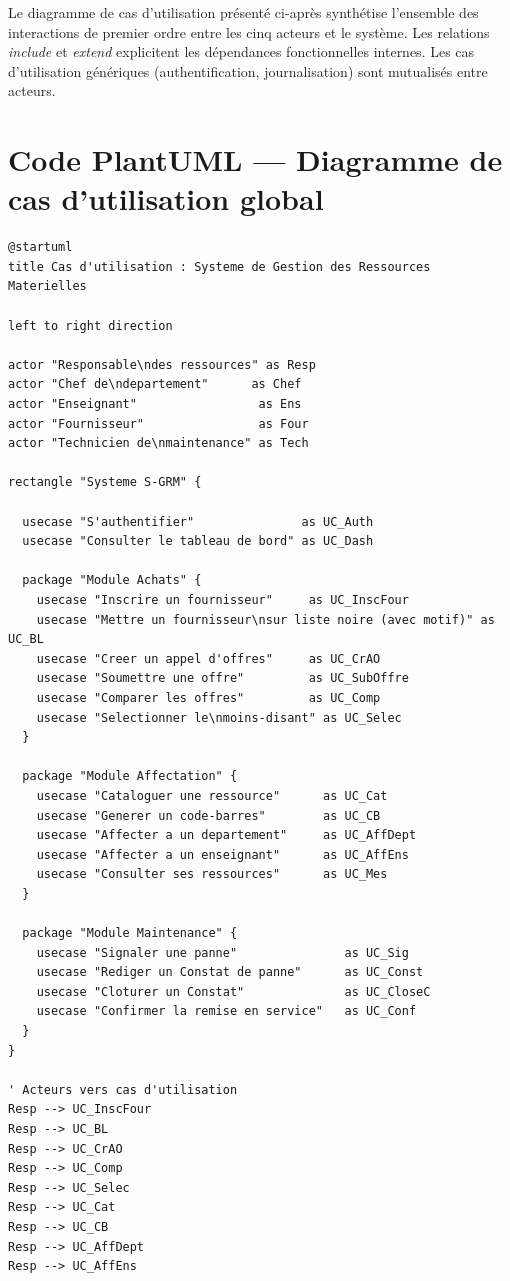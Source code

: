 \documentclass[a4paper,11pt,openany]{report}
\begin{document}
Le diagramme de cas d'utilisation présenté ci-après synthétise
l'ensemble des interactions de premier ordre entre les cinq
acteurs et le système. Les relations \emph{include} et
\emph{extend} explicitent les dépendances fonctionnelles
internes. Les cas d'utilisation génériques (authentification,
journalisation) sont mutualisés entre acteurs.

\section{Code PlantUML --- Diagramme de cas d'utilisation global}

\begin{lstlisting}[caption={Diagramme UML --- Cas d'utilisation global},
                   label={lst:umlUseCase}]
@startuml
title Cas d'utilisation : Systeme de Gestion des Ressources Materielles

left to right direction

actor "Responsable\ndes ressources" as Resp
actor "Chef de\ndepartement"      as Chef
actor "Enseignant"                 as Ens
actor "Fournisseur"                as Four
actor "Technicien de\nmaintenance" as Tech

rectangle "Systeme S-GRM" {

  usecase "S'authentifier"               as UC_Auth
  usecase "Consulter le tableau de bord" as UC_Dash

  package "Module Achats" {
    usecase "Inscrire un fournisseur"     as UC_InscFour
    usecase "Mettre un fournisseur\nsur liste noire (avec motif)" as UC_BL
    usecase "Creer un appel d'offres"     as UC_CrAO
    usecase "Soumettre une offre"         as UC_SubOffre
    usecase "Comparer les offres"         as UC_Comp
    usecase "Selectionner le\nmoins-disant" as UC_Selec
  }

  package "Module Affectation" {
    usecase "Cataloguer une ressource"      as UC_Cat
    usecase "Generer un code-barres"        as UC_CB
    usecase "Affecter a un departement"     as UC_AffDept
    usecase "Affecter a un enseignant"      as UC_AffEns
    usecase "Consulter ses ressources"      as UC_Mes
  }

  package "Module Maintenance" {
    usecase "Signaler une panne"               as UC_Sig
    usecase "Rediger un Constat de panne"      as UC_Const
    usecase "Cloturer un Constat"              as UC_CloseC
    usecase "Confirmer la remise en service"   as UC_Conf
  }
}

' Acteurs vers cas d'utilisation
Resp --> UC_InscFour
Resp --> UC_BL
Resp --> UC_CrAO
Resp --> UC_Comp
Resp --> UC_Selec
Resp --> UC_Cat
Resp --> UC_CB
Resp --> UC_AffDept
Resp --> UC_AffEns


\end{lstlisting}
\end{document}
